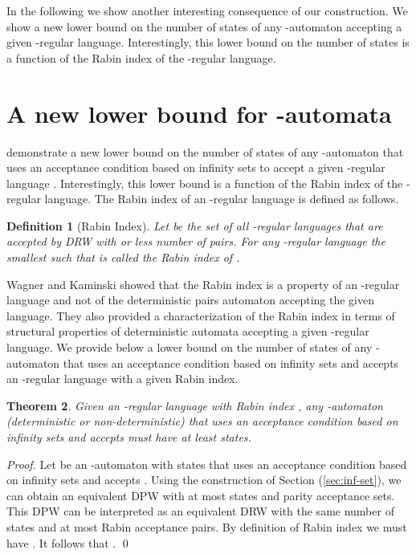 \documentclass[3p]{elsarticle}
\newtheorem{theorem}{Theorem}
\newtheorem{definition}[theorem]{Definition}
\newtheorem{proof}[theorem]{Proof}
\begin{document}
In the following we show another interesting consequence of our construction. We
show a new lower bound on the number of states of any -automaton
accepting a given -regular language. Interestingly, this lower bound on
the number of states is a function of the Rabin index of the -regular
language.






\section{A new lower bound for -automata}



demonstrate a new lower bound on the number of states of any
-automaton that uses an acceptance condition based on infinity
sets to accept a given -regular language . Interestingly,
this lower bound is a function of the Rabin index of the
-regular language. The Rabin index of an -regular
language is defined as follows.

\begin{definition}[Rabin Index]
\label{ri}
Let  be the set of all -regular languages that are
accepted by DRW with  or less number of pairs. For any -regular
language  the smallest  such that  is called the
Rabin index of .  

\end{definition}

Wagner \cite{wagner} and Kaminski\cite{kaminski} showed that the Rabin
index is a property of an -regular language and not of the
deterministic pairs automaton accepting the given language.  They also
provided a characterization of the Rabin index in terms of structural
properties of deterministic automata accepting a given
-regular language.  We provide below a lower bound on the
number of states of any -automaton that uses an acceptance
condition based on infinity sets and accepts an -regular language
with a given Rabin index.

\begin{theorem}
Given an -regular language  with Rabin index , any
-automaton (deterministic or non-deterministic) that uses an
acceptance condition based on infinity sets and accepts  must have
at least  states.
\end{theorem}
\begin{proof}
 Let  be an -automaton with 
states that uses an acceptance condition based on infinity sets and
accepts .  Using the construction of Section (\ref{sec:inf-set}),
we can obtain an equivalent DPW with at most  states and
 parity acceptance sets.  This DPW can be
interpreted as an equivalent DRW with the same number of states and at
most  Rabin acceptance pairs.  By definition of Rabin
index we must have .  It follows that . \qed
\end{proof}
\end{document}
